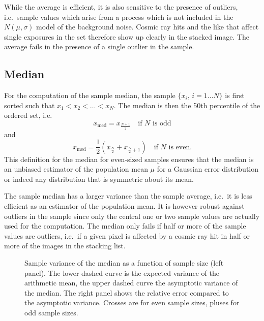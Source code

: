 While the average is efficient, it is also sensitive to the presence
of outliers, i.e.~sample values which arise from a process which is
not included in the $N(\mu,\sigma)$ model of the background
noise. Cosmic ray hits and the like that affect single exposures in
the set therefore show up clearly in the stacked image. The average
fails in the presence of a single outlier in the sample.


\subsection{Median}
\label{sec:algorithms:robust_mean:median}

For the computation of the sample median, the sample
$\{x_{i},\,i=1\dots N\}$ is first sorted such that $x_{1} < x_{2} <
\dots < x_{N}$. The median is then the 50th percentile of the ordered
set, i.e.
\begin{equation}
  \label{eq:median_odd}
  x_{\mathrm{med}} = x_{\frac{N+1}{2}} \quad \text{if $N$ is odd}
\end{equation}
and
\begin{equation}
  \label{eq:median_even}
  x_{\mathrm{med}} = \frac{1}{2}(x_{\frac{N}{2}} + x_{\frac{N}{2}+1}) \quad \text{if $N$ is even.}
\end{equation}
This definition for the median for even-sized samples ensures that the
median is an unbiased estimator of the population mean $\mu$ for a
Gaussian error distribution or indeed any distribution that is
symmetric about its mean.

The sample median has a larger variance than the sample average,
i.e.~it is less efficient as an estimator of the population mean. It
is however robust against outliers in the sample since only the central
one or two sample values are actually used for the computation. The
median only fails if half or more of the sample values are outliers,
i.e.~if a given pixel is affected by a cosmic ray hit in half or more
of the images in the stacking list.

\begin{figure}
  \subfigure
  \centering
  \caption{Sample variance of the median as a function of sample size
    (left panel). The lower dashed curve is the expected variance of
    the arithmetic mean, the upper dashed curve the asymptotic
    variance of the median. The right panel shows the relative error
    compared to the asymptotic variance. Crosses are for even sample
    sizes, pluses for odd sample sizes.}
  \label{fig:median_variance}
\end{figure}

